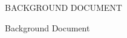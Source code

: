 \documentclass[12pt, oneside]{book2}
\newcommand{\documentTitle}{BACKGROUND DOCUMENT}
\newcommand{\documentSubtitle}{Background Document}
\newcommand{\documentAuthor}{John Meyer}
\newcommand{\documentYear}{2020}
\newcommand{\thesisAdvisor}{Daniela Inclezan, Ph. D}
\newcommand{\thesisFirstReader}{Alan Ferrenberg, Ph. D}
\newcommand{\thesisSecondReader}{Matthew Stephan, Ph. D}
\theoremstyle{definition}
\begin{document}
\begin{titlepage}
\begin{center}

    \documentTitle

    \vspace{1.5cm}

    \documentSubtitle \\


\end{center}
\thispagestyle{empty}
\end{titlepage}
\end{document}

